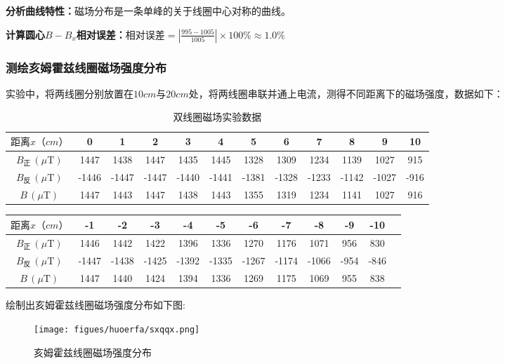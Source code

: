 \documentclass[]{../template/Report}%
\begin{document}
\begin{fullreportonly}
\textbf{分析曲线特性：}磁场分布是一条单峰的关于线圈中心对称的曲线。

\vspace{2mm}
\textbf{计算圆心$B-B_x$相对误差：}$\text{相对误差} = \left| \frac{995  - 1005}{1005 } \right| \times 100\%\approx 1.0\%$
\subsubsection{测绘亥姆霍兹线圈磁场强度分布}
实验中，将两线圈分别放置在$10cm$与$20cm$处，将两线圈串联并通上电流，测得不同距离下的磁场强度，数据如下：
\begin{table}[h]
    \centering
    \caption{双线圈磁场实验数据}
    \begin{tabular}{c c c c c c c c c c c c}
        \toprule
      $距离x（cm）$ & 0 & 1 & 2 & 3 & 4 & 5 & 6 & 7 & 8 & 9 & 10 \\
        \midrule
        \( B_{\text{正}} \, (\mu\text{T}) \) & 1447 & 1438 & 1447 & 1435 & 1445 & 1328 & 1309 & 1234 & 1139 & 1027 & 915 \\
        \( B_{\text{反}} \, (\mu\text{T}) \) & -1446 & -1447 & -1447 & -1440 & -1441 & -1381 & -1328 & -1233 & -1142 & -1027 & -916 \\
        \( B \, (\mu\text{T}) \) & 1447 & 1443 & 1447 & 1438 & 1443 & 1355 & 1319 & 1234 & 1141 & 1027 & 916 \\
        \bottomrule
    \end{tabular}
\end{table}
\begin{table}[h]
    \centering
    \begin{tabular}{c c c c c c c c c c c c}
        \toprule
      $ 距离x（cm）$ & -1 & -2 & -3 & -4 & -5 & -6 & -7 & -8 & -9 & -10 \\
        \midrule
        \( B_{\text{正}} \, (\mu\text{T}) \) & 1446 & 1442 & 1422 & 1396 & 1336 & 1270 & 1176 & 1071 & 956 & 830 \\
        \( B_{\text{反}} \, (\mu\text{T}) \) & -1447 & -1438 & -1425 & -1392 & -1335 & -1267 & -1174 & -1066 & -954 & -846 \\
        \( B \, (\mu\text{T}) \) & 1447 & 1440 & 1424 & 1394 & 1336 & 1269 & 1175 & 1069 & 955 & 838 \\
        \bottomrule
    \end{tabular}
\end{table}

\clearpage
绘制出亥姆霍兹线圈磁场强度分布如下图:
\begin{figure}[!h]
    \begin{center}
        \texttt{[image: figues/huoerfa/sxqqx.png]}
        \caption{亥姆霍兹线圈磁场强度分布}
    \end{center}
\end{figure}


\end{fullreportonly}
\end{document}
